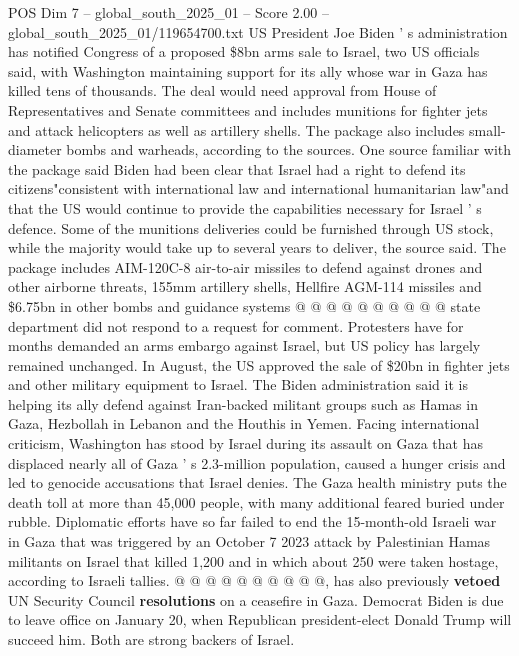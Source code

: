 \begin{textsample}{POS Dim 7 – global\_south\_2025\_01 – Score 2.00 – global\_south\_2025\_01/119654700.txt}  \label{ex:f7_pos_255}
US President Joe Biden ' s administration has notified Congress of a proposed \$8bn arms sale to Israel, two US officials said, with Washington maintaining support for its ally whose war in Gaza has killed tens of thousands.
The deal would need approval from House of Representatives and Senate committees and includes munitions for fighter jets and attack helicopters as well as artillery shells.
The package also includes small-diameter bombs and warheads, according to the sources.
One source familiar with the package said Biden had been clear that Israel had a right to defend its citizens"consistent with international law and international humanitarian law"and that the US would continue to provide the capabilities necessary for Israel ' s defence.
Some of the munitions deliveries could be furnished through US stock, while the majority would take up to several years to deliver, the source said.
The package includes AIM-120C-8 air-to-air missiles to defend against drones and other airborne threats, 155mm artillery shells, Hellfire AGM-114 missiles and \$6.75bn in other bombs and guidance systems @ @ @ @ @ @ @ @ @ @ state department did not respond to a request for comment.
Protesters have for months demanded an arms embargo against Israel, but US policy has largely remained unchanged.
In August, the US approved the sale of \$20bn in fighter jets and other military equipment to Israel.
The Biden administration said it is helping its ally defend against Iran-backed militant groups such as Hamas in Gaza, Hezbollah in Lebanon and the Houthis in Yemen.
Facing international criticism, Washington has stood by Israel during its assault on Gaza that has displaced nearly all of Gaza ' s 2.3-million population, caused a hunger crisis and led to genocide accusations that Israel denies.
The Gaza health ministry puts the death toll at more than 45,000 people, with many additional feared buried under rubble.
Diplomatic efforts have so far failed to end the 15-month-old Israeli war in Gaza that was triggered by an October 7 2023 attack by Palestinian Hamas militants on Israel that killed 1,200 and in which about 250 were taken hostage, according to Israeli tallies. @ @ @ @ @ @ @ @ @ @, has also previously \textbf{vetoed} UN Security Council \textbf{resolutions} on a ceasefire in Gaza.
Democrat Biden is due to leave office on January 20, when Republican president-elect Donald Trump will succeed him.
Both are strong backers of Israel.

\end{textsample}
